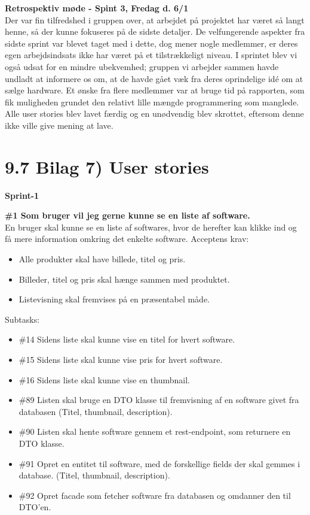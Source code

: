 \documentclass[11pt]{report}
\begin{document}
\noindent\textbf{Retrospektiv møde - Spint 3, Fredag d. 6/1}\\
\noindent Der var fin tilfredshed i gruppen over, at arbejdet på projektet har været så langt henne, så der kunne fokuseres på de sidste detaljer. De velfungerende aspekter fra sidste sprint var blevet taget med i dette, dog mener nogle medlemmer, er deres egen arbejdsindsats ikke har været på et tilstrækkeligt niveau. I sprintet blev vi også udsat for en mindre ubekvemhed; gruppen vi arbejder sammen havde undladt at informere os om, at de havde gået væk fra deres oprindelige idé om at sælge hardware. Et ønske fra flere medlemmer var at bruge tid på rapporten, som fik muligheden grundet den relativt lille mængde programmering som manglede. Alle user stories blev lavet færdig og en unødvendig blev skrottet, eftersom denne ikke ville give mening at lave.

\newpage
\section*{9.7 Bilag 7) User stories}
\noindent\textbf{Sprint-1}

\noindent\textbf{\#1 Som bruger vil jeg gerne kunne se en liste af software.}\\
\noindent En bruger skal kunne se en liste af softwares, hvor de herefter kan klikke ind og få mere information omkring det enkelte software.
\noindent Acceptens krav:
\begin{itemize}[topsep=0pt, partopsep=0pt]
  \item Alle produkter skal have billede, titel og pris.
  \item Billeder, titel og pris skal hænge sammen med produktet.
  \item Listevisning skal fremvises på en præsentabel måde.
\end{itemize}
\noindent Subtasks:
\begin{itemize}[topsep=0pt, partopsep=0pt]
  \item \#14 Sidens liste skal kunne vise en titel for hvert software.
  \item \#15 Sidens liste skal kunne vise pris for hvert software.
  \item \#16 Sidens liste skal kunne vise en thumbnail.
  \item \#89 Listen skal bruge en DTO klasse til fremvisning af en software givet fra databasen (Titel, thumbnail, description).
  \item \#90 Listen skal hente software gennem et rest-endpoint, som returnere en DTO klasse.
  \item \#91 Opret en entitet til software, med de forskellige fields der skal gemmes i database. (Titel, thumbnail, description).
  \item \#92 Opret facade som fetcher software fra databasen og omdanner den til DTO’en.
\end{itemize}
\end{document}
